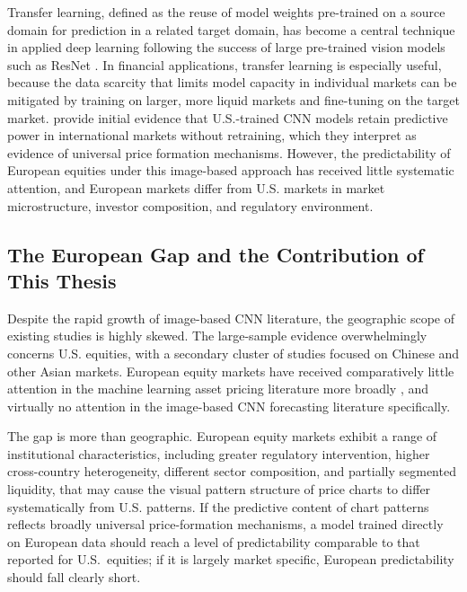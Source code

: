 Transfer learning, defined as the reuse of model weights pre-trained on a source domain for prediction in a related target domain, has become a central technique in applied deep learning following the success of large pre-trained vision models such as ResNet \parencite{he2016}. In financial applications, transfer learning is especially useful, because the data scarcity that limits model capacity in individual markets can be mitigated by training on larger, more liquid markets and fine-tuning on the target market. \textcite{Jiang2023} provide initial evidence that U.S.-trained CNN models retain predictive power in international markets without retraining, which they interpret as evidence of universal price formation mechanisms. However, the predictability of European equities under this image-based
approach has received little systematic attention, and European markets differ from U.S. markets in market microstructure, investor composition, and regulatory environment.

\subsection{The European Gap and the Contribution of This Thesis}

Despite the rapid growth of image-based CNN literature, the geographic scope of existing studies is highly skewed. The large-sample evidence overwhelmingly concerns U.S. equities, with a secondary cluster of studies focused on Chinese and other Asian markets. European equity markets have received comparatively little attention in the machine learning asset pricing literature more broadly \parencite{cakici2023}, and virtually no attention in the image-based CNN forecasting literature specifically.

The gap is more than geographic. European equity markets exhibit a range of institutional characteristics, including greater regulatory intervention, higher cross-country heterogeneity, different sector composition, and partially segmented liquidity, that may cause the visual pattern structure of price charts to differ systematically from U.S. patterns. If the predictive content of chart patterns reflects broadly universal price-formation mechanisms, a model trained directly on European data should reach a level of predictability comparable to that reported for U.S.\ equities; if it is largely market specific, European predictability should fall clearly short.

